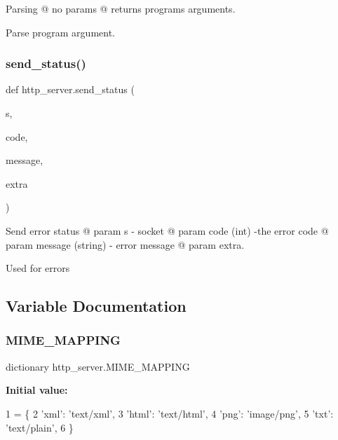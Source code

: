 Parsing @ no params @ returns program\textquotesingle{}s arguments. 

\begin{DoxyVerb}Parse program argument.\end{DoxyVerb}
 \mbox{\label{namespacehttp__server_a477ea01afb21d25af42c1a2d0c3b3e9d}} 
\subsubsection{\texorpdfstring{send\+\_\+status()}{send\_status()}}
{\footnotesize\ttfamily def http\+\_\+server.\+send\+\_\+status (\begin{DoxyParamCaption}\item[{}]{s,  }\item[{}]{code,  }\item[{}]{message,  }\item[{}]{extra }\end{DoxyParamCaption})}



Send error status @ param s -\/ socket @ param code (int) -\/the error code @ param message (string) -\/ error message @ param extra. 

Used for errors 

\subsection{Variable Documentation}
\mbox{\label{namespacehttp__server_accdabea87a1e256c5abae248726344ed}} 
\subsubsection{\texorpdfstring{M\+I\+M\+E\+\_\+\+M\+A\+P\+P\+I\+NG}{MIME\_MAPPING}}
{\footnotesize\ttfamily dictionary http\+\_\+server.\+M\+I\+M\+E\+\_\+\+M\+A\+P\+P\+I\+NG}

{\bfseries Initial value\+:}
\begin{DoxyCode}
1 =  \{
2     \textcolor{stringliteral}{'xml'}: \textcolor{stringliteral}{'text/xml'},
3     \textcolor{stringliteral}{'html'}: \textcolor{stringliteral}{'text/html'},
4     \textcolor{stringliteral}{'png'}: \textcolor{stringliteral}{'image/png'},
5     \textcolor{stringliteral}{'txt'}: \textcolor{stringliteral}{'text/plain'},
6 \}
\end{DoxyCode}
